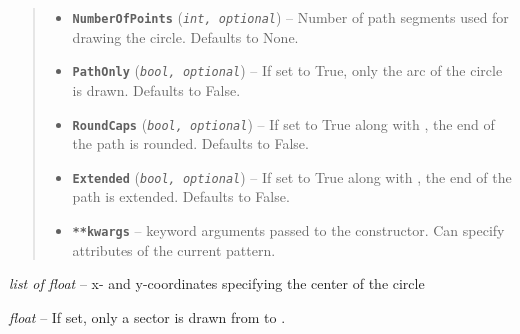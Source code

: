 \documentclass[letterpaper,10pt,english]{sphinxmanual}
\begin{document}
\begin{fulllineitems}
\begin{quote}
\begin{description}
\begin{itemize}
\item {} 
\textbf{\texttt{NumberOfPoints}} (\emph{\texttt{int, optional}}) -- Number of path segments used for drawing the circle.
Defaults to None.

\item {} 
\textbf{\texttt{PathOnly}} (\emph{\texttt{bool, optional}}) -- If set to True, only the arc of the circle is drawn.
Defaults to False.

\item {} 
\textbf{\texttt{RoundCaps}} (\emph{\texttt{bool, optional}}) -- If set to True along with , the end of the path is rounded.
Defaults to False.

\item {} 
\textbf{\texttt{Extended}} (\emph{\texttt{bool, optional}}) -- If set to True along with , the end of the path is extended.
Defaults to False.

\item {} 
\textbf{\texttt{**kwargs}} -- keyword arguments passed to the {\hyperref[Chapters/PythonModuleReference/Patterns/TXLWizard.Patterns.AbstractPattern:TXLWizard.Patterns.AbstractPattern.AbstractPattern]{}} constructor.
Can specify attributes of the current pattern.

\end{itemize}

\end{description}\end{quote}

\begin{fulllineitems}
\label{Chapters/PythonModuleReference/Patterns/TXLWizard.Patterns.Circle:TXLWizard.Patterns.Circle.Circle.Center}
\emph{list of float} -- x- and y-coordinates specifying the center of the circle

\end{fulllineitems}


\begin{fulllineitems}
\label{Chapters/PythonModuleReference/Patterns/TXLWizard.Patterns.Circle:TXLWizard.Patterns.Circle.Circle.EndAngle}
\emph{float} -- If set, only a sector is drawn from  to .


\end{fulllineitems}
\end{fulllineitems}
\end{document}
